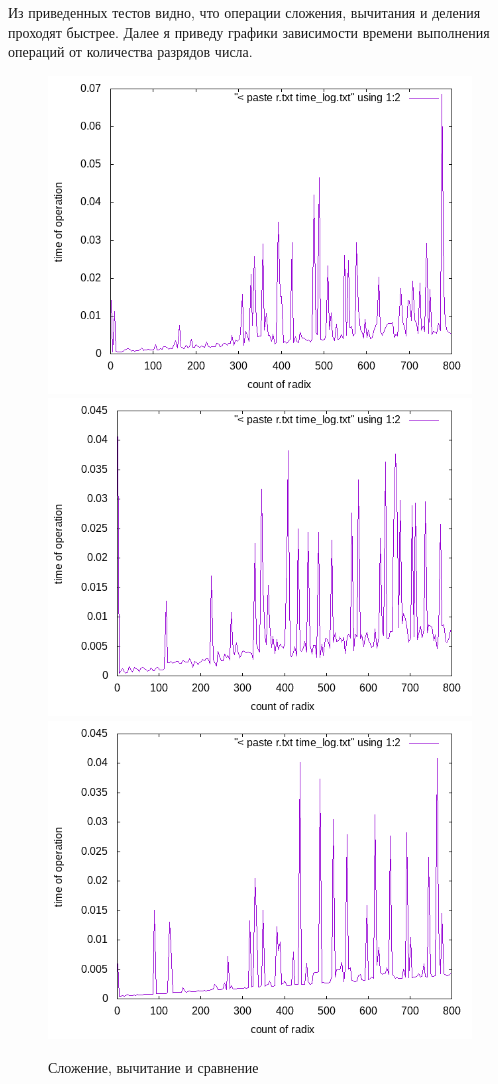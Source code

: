 Из приведенных тестов видно, что операции сложения, вычитания и деления проходят быстрее. Далее я приведу графики зависимости времени выполнения операций от количества разрядов числа. 
\begin{figure}[h]
  \includegraphics[scale=0.3]{../plots/plus.png}
  \includegraphics[scale=0.3]{../plots/minus.png}
  \includegraphics[scale=0.3]{../plots/comp.png}
  \caption{Сложение, вычитание и сравнение}
\end{figure}
